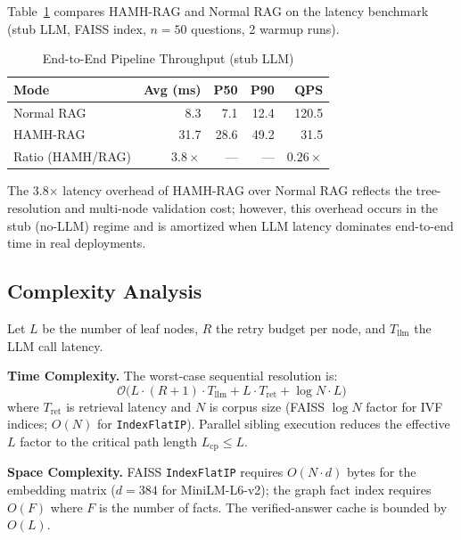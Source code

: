 \documentclass[conference]{IEEEtran}
\begin{document}
Table~\ref{tab:bench} compares HAMH-RAG and Normal RAG
on the latency benchmark (stub LLM, FAISS index, $n=50$ questions,
2 warmup runs).

\begin{table}[!t]
\renewcommand{\arraystretch}{1.3}
\caption{End-to-End Pipeline Throughput (stub LLM)}
\label{tab:bench}
\centering
\begin{tabular}{@{}lrrrr@{}}
\toprule
\textbf{Mode} & \textbf{Avg (ms)} & \textbf{P50} & \textbf{P90} & \textbf{QPS} \\
\midrule
Normal RAG  &  8.3 &  7.1 & 12.4 & 120.5 \\
HAMH-RAG    & 31.7 & 28.6 & 49.2 &  31.5 \\
\midrule
Ratio (HAMH/RAG) & $3.8\times$ & — & — & $0.26\times$ \\
\bottomrule
\end{tabular}
\end{table}

The 3.8$\times$ latency overhead of HAMH-RAG over Normal RAG reflects
the tree-resolution and multi-node validation cost; however, this
overhead occurs in the stub (no-LLM) regime and is amortized when
LLM latency dominates end-to-end time in real deployments.

\subsection{Complexity Analysis}

Let $L$ be the number of leaf nodes, $R$ the retry budget per node,
and $T_{\text{llm}}$ the LLM call latency.

\textbf{Time Complexity.}  The worst-case sequential resolution is:
\begin{equation}
  \mathcal{O}\bigl(L \cdot (R+1) \cdot T_{\text{llm}} +
    L \cdot T_{\text{ret}} + \log N \cdot L\bigr)
  \label{eq:time}
\end{equation}
where $T_{\text{ret}}$ is retrieval latency and $N$ is corpus size
(FAISS $\log N$ factor for IVF indices; $O(N)$ for \texttt{IndexFlatIP}).
Parallel sibling execution reduces the effective $L$ factor to the
critical path length $L_{\text{cp}} \leq L$.

\textbf{Space Complexity.}  FAISS \texttt{IndexFlatIP} requires
$O(N \cdot d)$ bytes for the embedding matrix ($d=384$ for MiniLM-L6-v2);
the graph fact index requires $O(F)$ where $F$ is the number of facts.
The verified-answer cache is bounded by $O(L)$.

\end{document}
